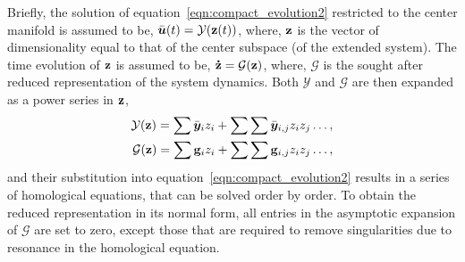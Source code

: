 Briefly, the solution of equation~\eqref{eqn:compact_evolution2} restricted to the center manifold is assumed to be, $\bar{\boldsymbol{u}}(t) = \mathcal{Y}(\mathbf{z}(t))$, where, $\mathbf{z}$ is the vector of dimensionality equal to that of the center subspace (of the extended system). The time evolution of $\mathbf{z}$ is assumed to be, $\accentset{\mbox{\large\bfseries .}}{\mathbf{z}} = \mathcal{G}(\mathbf{z})$, where, $\mathcal{G}$ is the sought after reduced representation of the system dynamics. Both $\mathcal{Y}$ and $\mathcal{G}$ are then expanded as a power series in $\mathbf{z}$,
\begin{subequations}
\begin{align}
	\mathcal{Y}(\mathbf{z}) = \sum \bar{\boldsymbol{y}}_{i}z_{i} + \sum \sum\bar{\boldsymbol{y}}_{i,j}z_{i}z_{j} \ldots, \\ 
	\mathcal{G}(\mathbf{z}) = \sum \mathbf{g}_{i}z_{i} + \sum \sum\mathbf{g}_{i,j}z_{i}z_{j} \ldots,
\end{align}
\end{subequations}
and their substitution into equation~\eqref{eqn:compact_evolution2} results in a series of homological equations, that can be solved order by order. To obtain the reduced representation in its normal form, all entries in the asymptotic expansion of $\mathcal{G}$ are set to zero, except those that are required to remove singularities due to resonance in the homological equation. 

